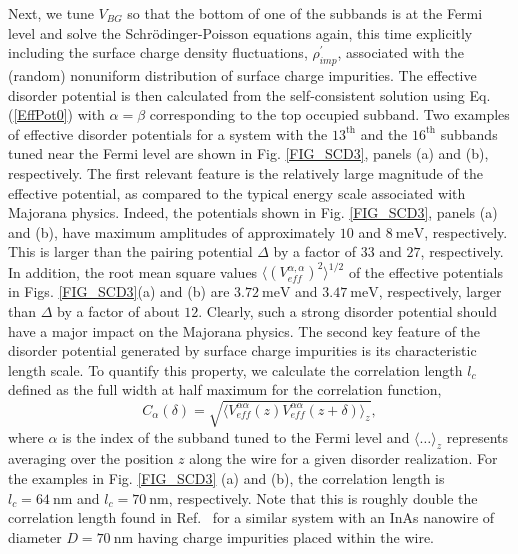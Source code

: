\documentclass[aps,prmaterials,twocolumn,superscriptaddress,longbibliography]{revtex4-2}
\begin{document}
Next, we tune $V_{BG}$ so that the bottom of one of the subbands is at the Fermi level and solve the Schr{\"o}dinger-Poisson equations again, this time explicitly including the surface charge density fluctuations, $\rho_{imp}^\prime$, associated with the (random) nonuniform distribution of surface charge impurities. 
The effective disorder potential is then calculated from the self-consistent solution using Eq. (\ref{EffPot0}) with $\alpha=\beta$ corresponding to the top occupied subband. Two examples of effective disorder potentials for a system with the $13^\text{th}$ and the $16^\text{th}$ subbands tuned near the Fermi level are shown in Fig. \ref{FIG_SCD3}, panels (a) and (b), respectively. The first relevant feature is the relatively large magnitude of the effective potential, as compared to the typical energy scale associated with Majorana physics. Indeed, the potentials shown in Fig. \ref{FIG_SCD3}, panels (a) and (b), have maximum amplitudes of approximately $10$ and $8~\text{meV}$, respectively. This is larger than the pairing potential $\Delta$ by a factor of $33$ and $27$, respectively. 
In addition, the root mean square values $\langle ( V_{eff}^{\alpha,\alpha})^2\rangle^{1/2}$ of the effective potentials in Figs. \ref{FIG_SCD3}(a) and (b) are $3.72 ~\text{meV}$ and $3.47 ~\text{meV}$, respectively, larger than $\Delta$ by a factor of about $12$. Clearly, such a strong disorder potential should have a major impact on the Majorana physics.
The second key feature of the disorder potential generated by surface charge impurities is its characteristic length scale. To quantify this property, we calculate the correlation length $l_c$ defined as the full width at half maximum for the correlation function,
\begin{equation}
    C_\alpha(\delta) = \sqrt{\bigg\langle V^{\alpha\alpha}_{eff}(z) V^{\alpha\alpha}_{eff}(z + \delta) \bigg\rangle_z},
\end{equation}
where $\alpha$ is the index of the subband tuned to the Fermi level and $\langle \dots\rangle_z$ represents averaging over the position $z$ along the wire for a given disorder realization. 
For the examples in Fig. \ref{FIG_SCD3} (a) and (b), the  correlation length is $l_c = 64 ~\text{nm}$ and $l_c = 70~\text{nm}$, respectively. Note that this is roughly double the correlation length found in Ref.~ for a similar system with an InAs nanowire of diameter $D = 70~\text{nm}$ having charge impurities placed within the wire. 
\end{document}
